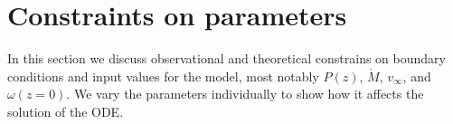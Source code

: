 \section{Constraints on parameters}
\label{sect:parameters}
In this section we discuss observational and theoretical constrains on boundary conditions and input values for the model, most notably $P(z)$, $\dot M$, $v_\infty$, and $\omega(z=0)$. We vary the parameters individually to show how it affects the solution of the ODE.